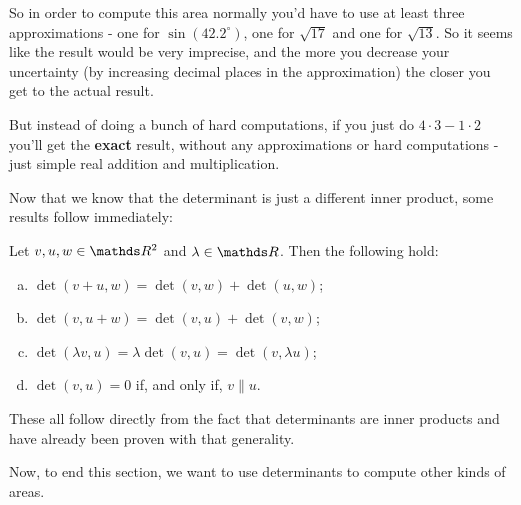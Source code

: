 \begin{ex}
	So in order to compute this area normally you'd have to use at least three approximations - one for $\sin(42.2^\circ)$, one for $\sqrt{17}$ and one for $\sqrt{13}$. So it seems like the result would be very imprecise, and the more you decrease your uncertainty (by increasing decimal places in the approximation) the closer you get to the actual result.
	
	But instead of doing a bunch of hard computations, if you just do $4\cdot 3-1\cdot 2$ you'll get the \textbf{exact} result, without any approximations or hard computations - just simple real addition and multiplication.
\end{ex}


Now that we know that the determinant is just a different inner product, some results follow immediately:

\begin{prop}
	Let $v,u,w\in \R^2$ and $\lambda\in \R$. Then the following hold:
	\begin{enumerate}[a)]
		\item $\det(v+u,w)=\det(v,w)+\det(u,w)$;
		\item $\det(v,u+w)=\det(v,u)+\det(v,w)$;
		\item $\det(\lambda v,u)=\lambda \det(v,u)=\det(v,\lambda u)$;
		\item $\det(v,u)=0$ if, and only if, $v\parallel u$.
	\end{enumerate}
\end{prop}

These all follow directly from the fact that determinants are inner products and have already been proven with that generality.

Now, to end this section, we want to use determinants to compute other kinds of areas.

